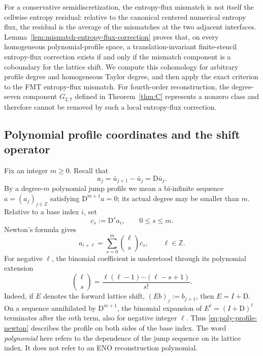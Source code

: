 \documentclass[11pt]{amsart}
\theoremstyle{plain}
\theoremstyle{definition}
\theoremstyle{remark}
\numberwithin{equation}{section}
\theoremstyle{plain}
\begin{document}
For a conservative semidiscretization, the entropy-flux mismatch is not
itself the cellwise entropy residual: relative to the canonical centered
numerical entropy flux, the residual is the average of the mismatches at the
two adjacent interfaces.  Lemma~\ref{lem:mismatch-entropy-flux-correction}
proves that, on every homogeneous polynomial-profile space, a
translation-invariant finite-stencil entropy-flux correction exists if and
only if the mismatch component is a coboundary for the lattice shift.  We
compute this cohomology for arbitrary profile degree and homogeneous Taylor
degree, and then apply the exact criterion to the FMT entropy-flux mismatch.
For fourth-order reconstruction, the degree-seven component $G_{2,7}$ defined
in Theorem~\ref{thm:C} represents a nonzero class and therefore cannot be
removed by such a local entropy-flux correction.


\subsection{Polynomial profile coordinates and the shift operator}
\label{sec:polynomial-profile-coordinates}

Fix an integer $m\ge0$.  Recall that
\[
a_j=\bar u_{j+1}-\bar u_j=\mathrm D\bar u_j.
\]
By a degree-$m$ polynomial jump profile we mean a bi-infinite sequence
$a=(a_j)_{j\in\mathbb Z}$ satisfying $\mathrm D^{m+1}a=0$; its actual
degree may be smaller than $m$.  Relative to a base index $i$, set
\begin{equation}\label{eq:profile-newton-coordinates}
	c_s:=\mathrm D^sa_i,
	\qquad 0\le s\le m.
\end{equation}
Newton's formula gives
\begin{equation}\label{eq:poly-profile-newton}
	a_{i+\ell}
	=\sum_{s=0}^{m}\binom{\ell}{s}c_s,
	\qquad \ell\in\mathbb Z.
\end{equation}
For negative $\ell$, the binomial coefficient is understood through its
polynomial extension
\[
\binom{\ell}{s}
=\frac{\ell(\ell-1)\cdots(\ell-s+1)}{s!}.
\]
Indeed, if $E$ denotes the forward lattice shift, $(Eb)_j:=b_{j+1}$, then
$E=I+\mathrm D$.  On a sequence annihilated by $\mathrm D^{m+1}$, the
binomial expansion of
$E^\ell=(I+\mathrm D)^\ell$ terminates after the $m$th term, also for
negative integer $\ell$.  Thus \eqref{eq:poly-profile-newton} describes the
profile on both sides of the base index.  The word \emph{polynomial} here
refers to the dependence of the jump sequence on its lattice index.  It does
not refer to an ENO reconstruction polynomial.
\end{document}
